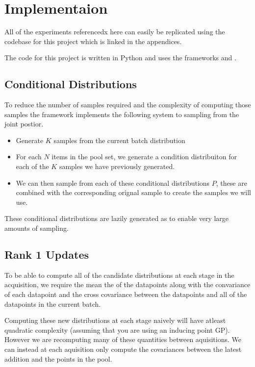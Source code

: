 \documentclass[12pt, a4paper]{report}
\theoremstyle{definition}
\begin{document}
\chapter{Implementaion}
\label{Chap6}

All of the experiments referencedx here can easily be replicated using the codebase for this project which is linked in the appendices.

The code for this project is written in Python and uses the frameworks \cite[Pytorch]{NEURIPS2019_9015} and \cite[GPytorch]{gardner2018gpytorch}.


\section{Conditional Distributions}
To reduce the number of samples required and the complexity of computing those samples the framework implements the following system to sampling from the joint postior.

\begin{itemize}
    \item Generate $K$ samples from the current batch distribution
    \item For each $N$ items in the pool set, we generate a condition distribuiton for each of the $K$ samples we have previously generated.
    \item We can then sample from each of these conditional distributions $P$, these are combined with the corresponding orignal sample to create the samples we will use.
\end{itemize}

These conditional distributions are lazily generated as to enable very large amounts of sampling.

\section{Rank 1 Updates}
To be able to compute all of the candidate distributions at each stage in the acquisition, we require the mean the of the datapoints along with the convariance of each datapoint and the cross covariance between the datapoints and all of the datapoints in the current batch.

Computing these new distributions at each stage naively will have atleast quadratic complexity (assuming that you are using an inducing point GP). However we are recomputing many of these quantities between aquisitions. We can instead at each aquisition only compute the covariances between the latest addition and the points in the pool.
\end{document}
